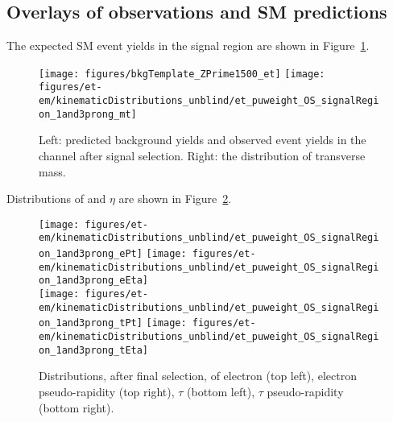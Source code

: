 \clearpage
\subsection{Overlays of observations and SM predictions}
\label{sec:et_overlays}

The expected SM event yields in the signal region are shown in
Figure~\ref{fig:etau_sm_template_and_mt}.
\begin{figure}\centering
  \texttt{[image: figures/bkgTemplate\_ZPrime1500\_et]}
  \texttt{[image: figures/et-em/kinematicDistributions\_unblind/et\_puweight\_OS\_signalRegion\_1and3prong\_mt]}
  \caption{\label{fig:etau_sm_template_and_mt} Left: predicted
    background yields and observed event yields in the \teth channel
    after signal selection.  Right: the distribution of transverse
    mass.}
\end{figure}

Distributions of \pt and $\eta$ are shown in Figure~\ref{fig:etau_sr_pt_eta}.
\begin{figure}\centering
  \texttt{[image: figures/et-em/kinematicDistributions\_unblind/et\_puweight\_OS\_signalRegion\_1and3prong\_ePt]}
  \texttt{[image: figures/et-em/kinematicDistributions\_unblind/et\_puweight\_OS\_signalRegion\_1and3prong\_eEta]} \\
  \texttt{[image: figures/et-em/kinematicDistributions\_unblind/et\_puweight\_OS\_signalRegion\_1and3prong\_tPt]}
  \texttt{[image: figures/et-em/kinematicDistributions\_unblind/et\_puweight\_OS\_signalRegion\_1and3prong\_tEta]}
  \caption{\label{fig:etau_sr_pt_eta} Distributions, after \teth final
    selection, of electron \pt (top left), electron pseudo-rapidity
    (top right), $\tau$ \pt (bottom left), $\tau$ pseudo-rapidity
    (bottom right).}
\end{figure}





